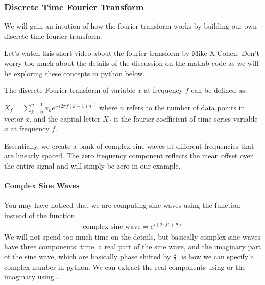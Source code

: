 \documentclass[letterpaper,10pt,english]{sphinxmanual}
\begin{document}
\subsubsection{Discrete Time Fourier Transform}
\label{\detokenize{content/Signal_Processing:discrete-time-fourier-transform}}
We will gain an intution of how the fourier transform works by building our own discrete time fourier transform.

Let’s watch this short video about the fourier transform by Mike X Cohen. Don’t worry too much about the details of the discussion on the matlab code as we will be exploring these concepts in python below.

\begin{sphinxVerbatim}[commandchars=\\\{\}]
\end{sphinxVerbatim}

\noindent{}

The discrete Fourier transform of variable \(x\) at frequency \(f\) can be defined as:

\(X_f = \sum\limits_{k=0}^{n-1} x_k e^{-i2\pi f(k-1)n^{-1}}\)
where \(n\) refers to the number of data points in vector \(x\), and the capital letter \(X_f\) is the fourier coefficient of time series variable \(x\) at frequency \(f\).

Essentially, we create a bank of complex sine waves at different frequencies that are linearly spaced. The zero frequency component reflects the mean offset over the entire signal and will simply be zero in our example.


\paragraph{Complex Sine Waves}
\label{\detokenize{content/Signal_Processing:complex-sine-waves}}
You may have noticed that we are computing  sine waves using the  function instead of the  function.
\begin{equation*}
\begin{split}\text{complex sine wave} = e^{i(2\pi ft + \theta)}\end{split}
\end{equation*}
We will not spend too much time on the details, but basically complex sine waves have three components: time, a real part of the sine wave, and the imaginary part of the sine wave, which are basically phase shifted by \(\frac{\pi}{2}\).
 is how we can specify a complex number in python. We can extract the real components using  or the imaginary using .
\end{document}
